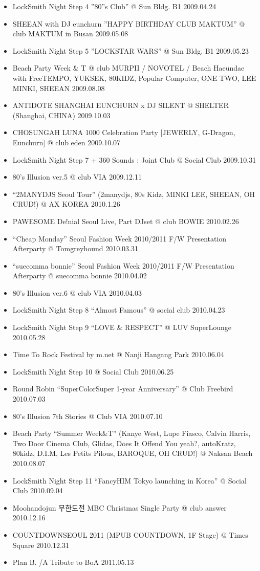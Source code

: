 \begin{itemize}
\item LockSmith Night Step 4 ”80”s Club” @ Sun Bldg. B1 \hfill 2009.04.24
\item SHEEAN with DJ eunchurn ”HAPPY BIRTHDAY CLUB MAKTUM” @ club MAKTUM in Busan \hfill 2009.05.08
\item LockSmith Night Step 5 ”LOCKSTAR WARS” @ Sun Bldg. B1 \hfill 2009.05.23
\item Beach Party Week \& T @ club MURPII / NOVOTEL / Beach Haeundae with FreeTEMPO, YUKSEK, 80KIDZ, Popular Computer, ONE TWO, LEE MINKI, SHEEAN \hfill 2009.08.08
\item ANTIDOTE SHANGHAI EUNCHURN x DJ SILENT @ SHELTER (Shanghai, CHINA) 2009.10.03
\item CHOSUNGAH LUNA 1000 Celebration Party [JEWERLY, G-Dragon, Eunchurn] @ club eden \hfill 2009.10.07
\item LockSmith Night Step 7 + 360 Sounds : Joint Club @ Social Club \hfill 2009.10.31
\item 80’s Illusion ver.5 @ club VIA \hfill 2009.12.11
\item “2MANYDJS Seoul Tour” (2manydjs, 80s Kidz, MINKI LEE, SHEEAN, OH CRUD!) @ AX KOREA \hfill 2010.1.26
\item PAWESOME De!nial Seoul Live, Part DJset @ club BOWIE \hfill 2010.02.26
\item “Cheap Monday” Seoul Fashion Week 2010/2011 F/W Presentation Afterparty @ Tomgreyhound \hfill 2010.03.31
\item “suecomma bonnie” Seoul Fashion Week 2010/2011 F/W Presentation Afterparty @ suecomma bonnie \hfill 2010.04.02
\item 80’s Illusion ver.6 @ club VIA \hfill 2010.04.03
\item LockSmith Night Step 8 “Almost Famous” @ social club \hfill 2010.04.23
\item LockSmith Night Step 9 “LOVE \& RESPECT” @ LUV SuperLounge \hfill 2010.05.28
\item Time To Rock Festival by m.net @ Nanji Hangang Park \hfill 2010.06.04
\item LockSmith Night Step 10 @ Social Club \hfill 2010.06.25
\item Round Robin “SuperColorSuper 1-year Anniversary” @ Club Freebird \hfill 2010.07.03
\item 80’s Illusion 7th Stories @ Club VIA \hfill 2010.07.10
\item Beach Party “Summer Week\&T” (Kanye West, Lupe Fiasco, Calvin Harris, Two Door Cinema Club, Glidas, Does It Offend You yeah?, autoKratz, 80kidz, D.I.M, Les Petits Pilous, BAROQUE, OH CRUD!) @ Naksan Beach \hfill 2010.08.07
\item LockSmith Night Step 11 “FancyHIM Tokyo launching in Korea” @ Social Club \hfill 2010.09.04
\item Moohandojun 무한도전 MBC Christmas Single Party @ club answer \hfill 2010.12.16
\item COUNTDOWNSEOUL 2011 (MPUB COUNTDOWN, 1F Stage) @ Times Square \hfill 2010.12.31
\item Plan B. /A Tribute to BoA \hfill 2011.05.13
\end{itemize}